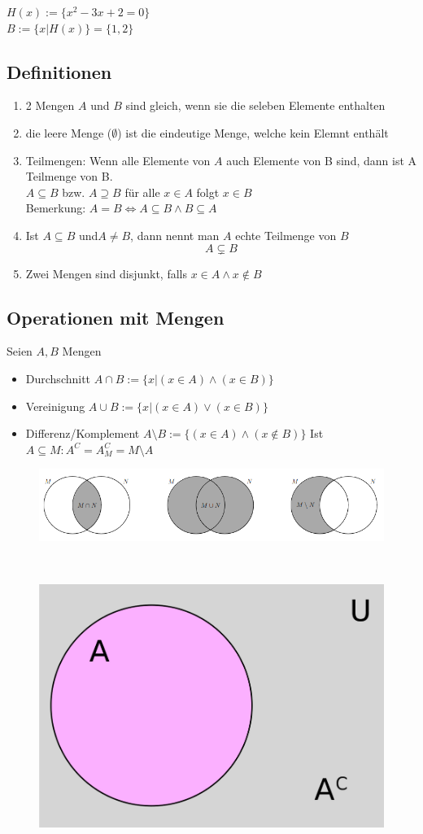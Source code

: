 \documentclass{article}
\begin{document}
        $H(x):=\{x^2-3x+2=0\}$\\
        $B:=\{x|H(x)\}=\{1,2\}$\\
        \subsection*{Definitionen}
            \begin{enumerate}
                \item 2 Mengen $A$ und $B$ sind gleich, wenn sie die seleben Elemente enthalten
                \item die leere Menge ($\emptyset$) ist die eindeutige Menge, welche kein Elemnt enthält
                \item Teilmengen: Wenn alle Elemente von $A$ auch Elemente von B sind, dann ist A Teilmenge von B.\\
                $A\subseteq B$ bzw. $A\supseteq B$ für alle $x\in A$ folgt $x\in B$\\
                Bemerkung: $A=B\iff A\subseteq B\land B\subseteq A$
                \item Ist $A\subseteq B $ und$ A\neq B$, dann nennt man $A$ echte Teilmenge von $B$ $$A\subsetneq B$$
                \item Zwei Mengen sind disjunkt, falls $x\in A\land x\notin B$  
            \end{enumerate}

        \subsection{Operationen mit Mengen}
            Seien $A,B$ Mengen
            \begin{itemize}
                \item Durchschnitt $A\cap B :=\{x|(x\in A)\land (x\in B)\}$
                \item Vereinigung $A\cup B :=\{x|(x\in A)\lor (x\in B)\}$
                \item Differenz/Komplement $A\setminus B :=\{(x\in A)\land (x \notin B)\}$
                \subitem Ist $A\subseteq M: A^C=A^C_M=M\setminus A $
            \end{itemize}
            \begin{figure}[h]
                \centering
                \includegraphics[width=0.75\linewidth]{Mengen.png}
                \\
            \end{figure}\\
            \begin{figure}[h]
                \centering
                \includegraphics[width=0.25\linewidth]{Screenshot from 2023-10-26 12-00-55.png}
            \end{figure}
\end{document}
